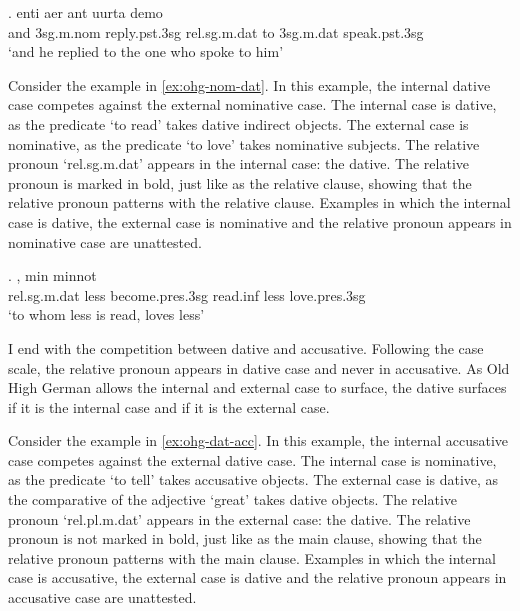 \exg. enti aer {ant uurta} demo  \\
and 3\ac{sg}.\ac{m}.\ac{nom} reply.\ac{pst}.3\ac{sg}\scsub{[dat]} \ac{rel}.\ac{sg}.\ac{m}.\ac{dat} {to 3\ac{sg}.\ac{m}.\ac{dat}} speak.\ac{pst}.3\ac{sg}\scsub{[nom]}\\
`and he replied to the one who spoke to him' \label{ex:ohg-dat-nom}

Consider the example in \ref{ex:ohg-nom-dat}. In this example, the internal dative case competes against the external nominative case.
The internal case is dative, as the predicate  `to read' takes dative indirect objects.
The external case is nominative, as the predicate  `to love' takes nominative subjects.
The relative pronoun  `\ac{rel}.\ac{sg}.\ac{m}.\ac{dat}' appears in the internal case: the dative. The relative pronoun is marked in bold, just like as the relative clause, showing that the relative pronoun patterns with the relative clause.
Examples in which the internal case is dative, the external case is nominative and the relative pronoun appears in nominative case are unattested.

\exg.    , min minnot\\
\ac{rel}.\ac{sg}.\ac{m}.\ac{dat} less become.\ac{pres}.3\ac{sg} read.\ac{inf}\scsub{[dat]} less love.\ac{pres}.3\ac{sg}\scsub{[nom]}\\
`to whom less is read, loves less' \label{ex:ohg-nom-dat}

I end with the competition between dative and accusative. Following the case scale, the relative pronoun appears in dative case and never in accusative. As Old High German allows the internal and external case to surface, the dative surfaces if it is the internal case and if it is the external case.

Consider the example in \ref{ex:ohg-dat-acc}. In this example, the internal accusative case competes against the external dative case.
The internal case is nominative, as the predicate  `to tell' takes accusative objects.
The external case is dative, as the comparative of the adjective  `great' takes dative objects.
The relative pronoun  `\ac{rel}.\ac{pl}.\ac{m}.\ac{dat}' appears in the external case: the dative. The relative pronoun is not marked in bold, just like as the main clause, showing that the relative pronoun patterns with the main clause.
Examples in which the internal case is accusative, the external case is dative and the relative pronoun appears in accusative case are unattested.

